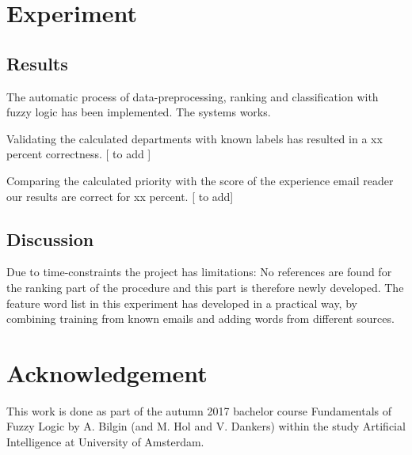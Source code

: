 \documentclass[journal]{IEEEtran}
\begin{document}
\section{Experiment}

\subsection{Results}

The automatic process of data-preprocessing, ranking and classification with fuzzy logic has been implemented. The systems works. 

Validating the calculated departments with known labels has resulted in a xx percent correctness. [ to add ]

Comparing the calculated priority with the score of the experience email reader our results are correct for xx percent. [ to add]

\subsection{Discussion}

Due to time-constraints the project has limitations: No references are found for the ranking part of the procedure and this part is therefore newly developed. The feature word list in this experiment has developed in a practical way, by combining training from known emails and adding words from different sources.

\section{Acknowledgement}

This work is done as part of the autumn 2017 bachelor course Fundamentals of Fuzzy Logic by A. Bilgin (and  M. Hol and V. Dankers) within the study Artificial Intelligence at University of Amsterdam.
\end{document}
